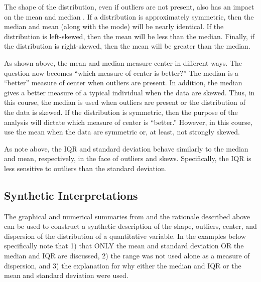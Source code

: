
The shape of the distribution, even if outliers are not present, also has an impact on the mean and median . If a distribution is approximately symmetric, then the median and mean (along with the mode) will be nearly identical. If the distribution is left-skewed, then the mean will be less than the median. Finally, if the distribution is right-skewed, then the mean will be greater than the median.

\begin{knitrout}
\color{fgcolor}\begin{kframe}


{\ttfamily\noindent\bfseries{}}

{\ttfamily\noindent\bfseries{}}\end{kframe}
\end{knitrout}


As shown above, the mean and median measure center in different ways. The question now becomes ``which measure of center is better?''  The median is a ``better'' measure of center when outliers are present. In addition, the median gives a better measure of a typical individual when the data are skewed. Thus, in this course, the median is used when outliers are present or the distribution of the data is skewed. If the distribution is symmetric, then the purpose of the analysis will dictate which measure of center is ``better.''  However, in this course, use the mean when the data are symmetric or, at least, not strongly skewed.

As note above, the IQR and standard deviation behave similarly to the median and mean, respectively, in the face of outliers and skews. Specifically, the IQR is less sensitive to outliers than the standard deviation.


\subsection{Synthetic Interpretations}
The graphical and numerical summaries from  and the rationale described above can be used to construct a synthetic description of the shape, outliers, center, and dispersion of the distribution of a quantitative variable. In the examples below specifically note that 1) that ONLY the mean and standard deviation OR the median and IQR are discussed, 2) the range was not used alone as a measure of dispersion, and 3) the explanation for why either the median and IQR or the mean and standard deviation were used.

